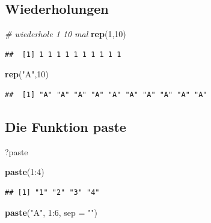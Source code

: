 \documentclass[]{article}
\newenvironment{Shaded}{\begin{snugshade}}{\end{snugshade}}
\newcommand{\KeywordTok}[1]{\textcolor[rgb]{0.13,0.29,0.53}{\textbf{{#1}}}}
\newcommand{\DataTypeTok}[1]{\textcolor[rgb]{0.13,0.29,0.53}{{#1}}}
\newcommand{\DecValTok}[1]{\textcolor[rgb]{0.00,0.00,0.81}{{#1}}}
\newcommand{\StringTok}[1]{\textcolor[rgb]{0.31,0.60,0.02}{{#1}}}
\newcommand{\CommentTok}[1]{\textcolor[rgb]{0.56,0.35,0.01}{\textit{{#1}}}}
\newcommand{\NormalTok}[1]{{#1}}
\begin{document}
\subsection{Wiederholungen}\label{wiederholungen}

\begin{Shaded}
\begin{Highlighting}[]
\CommentTok{# wiederhole 1 10 mal}
\KeywordTok{rep}\NormalTok{(}\DecValTok{1}\NormalTok{,}\DecValTok{10}\NormalTok{)}
\end{Highlighting}
\end{Shaded}

\begin{verbatim}
##  [1] 1 1 1 1 1 1 1 1 1 1
\end{verbatim}

\begin{Shaded}
\begin{Highlighting}[]
\KeywordTok{rep}\NormalTok{(}\StringTok{"A"}\NormalTok{,}\DecValTok{10}\NormalTok{)}
\end{Highlighting}
\end{Shaded}

\begin{verbatim}
##  [1] "A" "A" "A" "A" "A" "A" "A" "A" "A" "A"
\end{verbatim}

\subsection{Die Funktion paste}\label{die-funktion-paste}

\begin{Shaded}
\begin{Highlighting}[]
\NormalTok{?paste}
\end{Highlighting}
\end{Shaded}

\begin{Shaded}
\begin{Highlighting}[]
\KeywordTok{paste}\NormalTok{(}\DecValTok{1}\NormalTok{:}\DecValTok{4}\NormalTok{)}
\end{Highlighting}
\end{Shaded}

\begin{verbatim}
## [1] "1" "2" "3" "4"
\end{verbatim}

\begin{Shaded}
\begin{Highlighting}[]
\KeywordTok{paste}\NormalTok{(}\StringTok{"A"}\NormalTok{, }\DecValTok{1}\NormalTok{:}\DecValTok{6}\NormalTok{, }\DataTypeTok{sep =} \StringTok{""}\NormalTok{)}
\end{Highlighting}
\end{Shaded}
\end{document}
